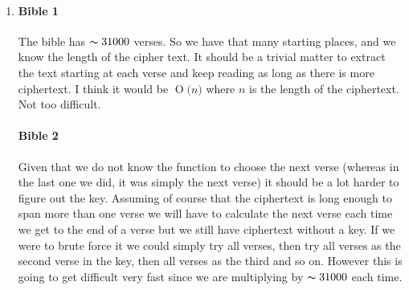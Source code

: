 \documentclass{article}
\newcommand{\BigO}[1]{\ensuremath{\operatorname{O}\bigl(#1\bigr)}}
\begin{document}
\begin{enumerate}
  \begin{paragraph}{Message:}
    PRESIDENT BARACK OBAMA IS EXPECTED TO ANNOUNCE CHANGES ON FRIDAY TO SWEEPING
    US SURVEILLANCE EFFORTS EXPOSED BY INTELLIGENCE LEAKER EDWARD SNOWDEN WHOSE BLOCKBUSTER
    DISCLOSURES HAVE RAISED QUESTIONS ABOUT GOVERNMENT OVERREACH IN FIGHTING TERROR
    THE SCOPE OF PHONE AND EMAIL SNOOPING BY THE NATIONAL SECURITY AGENCY THAT CAME TO
    LIGHT LAST YEAR TRIGGERED OUTRAGE FROM CIVIL LIBERTARIANS AND PROMPTED KEY MEMBERS 
    OF CONGRESS FROM BOTH PARTIES TO WEIGH CHANGES IN NATIONAL SECURITY LAW OBAMA IS 
    EXPECTED TO ACT ON RECOMMENDATIONS FROM AN INDEPENDENT PANEL THAT HE CALLED FOR 
    AT THE HEIGHT OF THE FALLOUT FROM THE LEAKS AROUND THE AGENCYS SURVEILLANCE 
    ACTIVITIES AND A SECRET COURT THAT WORKS WITH IT THE PRESIDENT IAL REVIEW GROUP 
    ON INTELLIGE NCE CONCLUDED IN DECEMBER THAT DATA COLLECTION SHOULD REMAIN BUT 
    THAT THE GOVERNMENT MUST DO A BETTER JOB OF PROTECTING CIVIL LIBERTIES IN THE 
    CONTEXT OF NATIONAL SECURITY CHANGES IMPOSED BY THE PRESIDENT WILL PERMANENTLY 
    PLACE HIS SIGNATURE ON THE INTELLIGENCE INITIATIVE AND HELP DEFINE HIS LEGACY
    AS A CHIEF EXECUTIVE WHO PROMISED A MORE OPEN AND TRANSPARENT GOVERNMENT WHEN HE 
    ENTERED THE WHITE HOUSE FIVE YEARS AGO NSA DOMESTIC AND INTERNATIONAL PHONE 
    AND EMAIL SURVEILLANCE IS CONS IDEREDSOME OF THE MOST WIDESPREAD INTELLIGENCE 
    GATHERING PERFORMED BY THE US GOVERNMENT
  \end{paragraph}
  
\item \hfill
  \paragraph{Bible 1}{The bible has $\thicksim31000$ verses. So we have that many starting places, and we know the length of the cipher text. It should be a trivial matter to extract the text starting at each verse and keep reading as long as there is more ciphertext. I think it would be \BigO{n} where $n$ is the length of the ciphertext. Not too difficult.}
  
  \paragraph{Bible 2}{Given that we do not know the function to choose the next verse (whereas in the last one we did, it was simply the next verse) it should be a lot harder to figure out the key. Assuming of course that the ciphertext is long enough to span more than one verse we will have to calculate the next verse each time we get to the end of a verse but we still have ciphertext without a key. If we were to brute force it we could simply try all verses, then try all verses as the second verse in the key, then all verses as the third and so on. However this is going to get difficult very fast since we are multiplying by $\thicksim31000$ each time.}


\end{enumerate}
\end{document}
